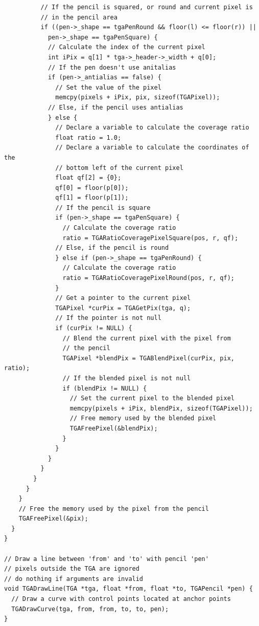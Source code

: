\documentclass[12pt, a4paper]{article}
\begin{document}
\begin{scriptsize}
\begin{ttfamily}
\begin{lstlisting}
          // If the pencil is squared, or round and current pixel is
          // in the pencil area
          if ((pen->_shape == tgaPenRound && floor(l) <= floor(r)) ||
            pen->_shape == tgaPenSquare) {
            // Calculate the index of the current pixel
            int iPix = q[1] * tga->_header->_width + q[0];
            // If the pen doesn't use anitalias
            if (pen->_antialias == false) {
              // Set the value of the pixel
              memcpy(pixels + iPix, pix, sizeof(TGAPixel));
            // Else, if the pencil uses antialias
            } else {
              // Declare a variable to calculate the coverage ratio
              float ratio = 1.0;
              // Declare a variable to calculate the coordinates of the
              // bottom left of the current pixel
              float qf[2] = {0};
              qf[0] = floor(p[0]);
              qf[1] = floor(p[1]);
              // If the pencil is square
              if (pen->_shape == tgaPenSquare) {
                // Calculate the coverage ratio
                ratio = TGARatioCoveragePixelSquare(pos, r, qf);
              // Else, if the pencil is round
              } else if (pen->_shape == tgaPenRound) {
                // Calculate the coverage ratio
                ratio = TGARatioCoveragePixelRound(pos, r, qf);
              }
              // Get a pointer to the current pixel
              TGAPixel *curPix = TGAGetPix(tga, q);
              // If the pointer is not null
              if (curPix != NULL) {
                // Blend the current pixel with the pixel from 
                // the pencil
                TGAPixel *blendPix = TGABlendPixel(curPix, pix, ratio);
                // If the blended pixel is not null
                if (blendPix != NULL) {
                  // Set the current pixel to the blended pixel
                  memcpy(pixels + iPix, blendPix, sizeof(TGAPixel));
                  // Free memory used by the blended pixel
                  TGAFreePixel(&blendPix);
                }
              }
            }
          }
        }
      }
    }
    // Free the memory used by the pixel from the pencil
    TGAFreePixel(&pix);
  }
}

// Draw a line between 'from' and 'to' with pencil 'pen'
// pixels outside the TGA are ignored
// do nothing if arguments are invalid
void TGADrawLine(TGA *tga, float *from, float *to, TGAPencil *pen) {
  // Draw a curve with control points located at anchor points
  TGADrawCurve(tga, from, from, to, to, pen);
}
  

\end{lstlisting}
\end{ttfamily}
\end{scriptsize}
\end{document}
